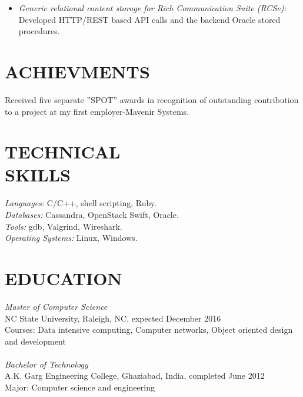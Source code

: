 \documentclass[margin]{res}
\begin{document}
\begin{resume}
\begin{itemize}
				\item  {\sl Generic relational content storage for Rich Communication Suite (RCSe):} Developed HTTP/REST based API calls and the backend Oracle stored procedures.

			   \end{itemize}

\section{ACHIEVMENTS} %
					   Received five separate ''SPOT'' awards in recognition of outstanding contribution to a project at my first employer-Mavenir Systems.\\

\section{TECHNICAL \\ SKILLS} {\sl Languages:} C/C++, shell scripting, Ruby.\\
                {\sl Databases:} Cassandra, OpenStack Swift, Oracle.\\
                {\sl Tools:} gdb, Valgrind, Wireshark.\\
                {\sl Operating Systems:} Linux, Windows.\\

\section{EDUCATION} {\sl Master of Computer Science} \\
                NC State University, Raleigh, NC, 
                expected December 2016 \\
                Courses: Data intensive computing, Computer networks, Object oriented design and development \\ \\
				{\sl Bachelor of Technology} \\ 
				A.K. Garg Engineering College, Ghaziabad, India, completed June 2012\\
                Major: Computer science and engineering \\

\end{resume}
\end{document}
